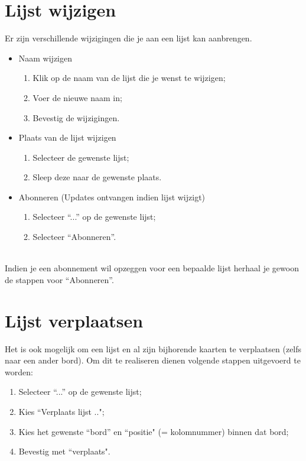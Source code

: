 \section{Lijst wijzigen}
Er zijn verschillende wijzigingen die je aan een lijst kan aanbrengen.
\begin{itemize}
	\item Naam wijzigen
	\begin{enumerate}
		\item Klik op de naam van de lijst die je wenst te wijzigen;
		\item Voer de nieuwe naam in;
		\item Bevestig de wijzigingen.
	\end{enumerate}
	\item Plaats van de lijst wijzigen	
	\begin{enumerate}
		\item Selecteer de gewenste lijst;
		\item Sleep deze naar de gewenste plaats.
	\end{enumerate}
	\item Abonneren (Updates ontvangen indien lijst wijzigt)
	\begin{enumerate}
		\item Selecteer ``...'' op de gewenste lijst;
		\item Selecteer ``Abonneren''.
	\end{enumerate}
\end{itemize}
\noindent
\\Indien je een abonnement wil opzeggen voor een bepaalde lijst herhaal je gewoon de stappen voor ``Abonneren''.

\section{Lijst verplaatsen}

Het is ook mogelijk om een lijst en al zijn bijhorende kaarten te verplaatsen (zelfs naar een ander bord). Om dit te realiseren dienen volgende stappen uitgevoerd te worden:
\begin{enumerate}[nolistsep]
	\item Selecteer ``...'' op de gewenste lijst;
	\item Kies ``Verplaats lijst ..";
	\item Kies het gewenste ``bord'' en ``positie" (= kolomnummer) binnen dat bord;
	\item Bevestig met ``verplaats".
\end{enumerate}

